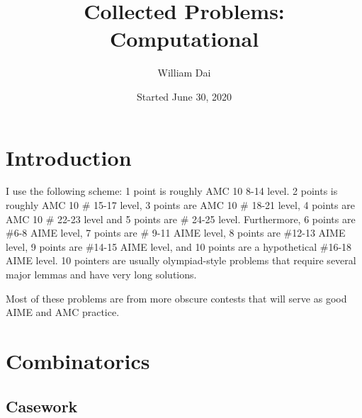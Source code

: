 \documentclass[11pt]{article}
\title{Collected Problems: Computational}
\author{William Dai}
\date{Started June 30, 2020}
\begin{document}
\maketitle

\section{Introduction}
I use the following scheme: 1 point is roughly AMC 10 8-14 level. 2 points is roughly AMC 10 \# 15-17 level, 3 points are AMC 10 \# 18-21 level, 4 points are AMC 10 \# 22-23 level and 5 points are \# 24-25 level. Furthermore, 6 points are \#6-8 AIME level, 7 points are \# 9-11 AIME level,   8 points are \#12-13 AIME level, 9 points are \#14-15 AIME level, and 10 points are a hypothetical \#16-18 AIME level. 10 pointers are usually olympiad-style problems that require several major lemmas and have very long solutions.

Most of these problems are from more obscure contests that will serve as good AIME and AMC practice. 

\section{Combinatorics}
\subsection{Casework}
\end{document}

